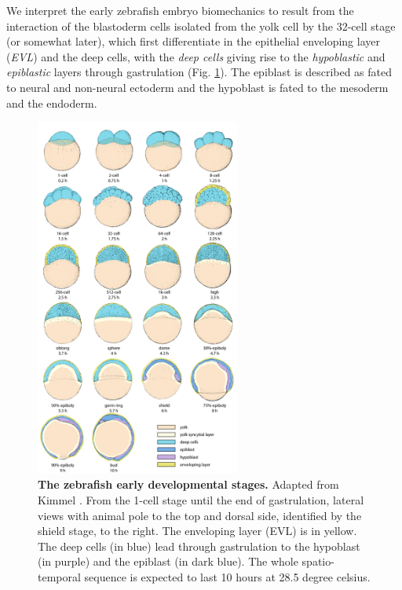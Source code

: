 We interpret the early zebrafish embryo biomechanics to result from the interaction of the blastoderm cells isolated from the yolk cell by the 32-cell stage (or somewhat later), which first differentiate in the epithelial enveloping layer (\textit{EVL}) and the deep cells, with the \textit{deep cells} giving rise to the \textit{hypoblastic} and \textit{epiblastic} layers through gastrulation (Fig. \ref{zebrafish_10h_review_kimmel_drawings_augmented}). The epiblast is described as fated to neural and non-neural ectoderm and the hypoblast is fated to the mesoderm and the endoderm.
\begin{figure}
\begin{center}
\includegraphics[width=0.6\textwidth]{../../images/zebrafish_10h_review/kimmel_drawings_augmented.png}
\end{center}
\caption{\textbf{The zebrafish early developmental stages. } Adapted from Kimmel \cite{Kimmel:1995kn}. From the 1-cell stage until the end of gastrulation, lateral views with animal pole to the top and dorsal side, identified by the shield stage, to the right. The enveloping layer (EVL) is in yellow. The deep cells (in blue) lead through gastrulation to the hypoblast (in purple) and the epiblast (in dark blue).  The whole spatio-temporal sequence is expected to last 10 hours at 28.5 degree celsius. 
}
\label{zebrafish_10h_review_kimmel_drawings_augmented}
\end{figure}

